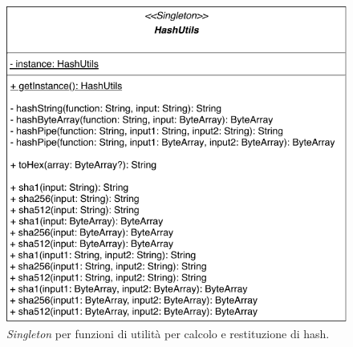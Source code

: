 	\begin{figure}
		\centering
		\includegraphics[scale=0.65]{figure/HashUtils.pdf}
		\caption{\textit{Singleton} per funzioni di utilità per calcolo e restituzione di hash.}\label{fig:hashUtils}
	\end{figure}

